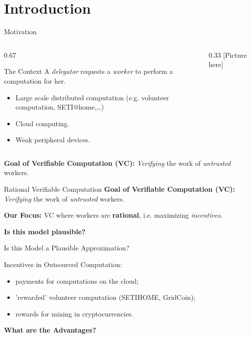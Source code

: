 \section{Introduction}

\begin{frame}{Motivation}

\begin{columns}
	\begin{column}{0.67\textwidth}
\begin{block}{The Context}
	A \textit{delegator} requests a \textit{worker} to perform a computation for her.
\end{block}
\onslide<+->
\begin{itemize}[<+- | alert@+>]
	\item Large scale distributed computation (e.g. volunteer computation, SETI@home,\dots)
	\item Cloud computing.
	\item Weak peripheral devices.
\end{itemize}
\end{column}
\begin{column}{0.33\textwidth}
[Picture here]
\end{column}
\end{columns}
\pause
\bigskip
\textbf{Goal of Verifiable Computation (VC):} \textit{Verifying} the work of \textit{untrusted} workers.
\end{frame}

\begin{frame}{Rational Verifiable Computation}
\textbf{Goal of Verifiable Computation (VC):} \textit{Verifying} the work of \textit{untrusted} workers.\pause

\textbf{Our Focus: } VC where workers are \textbf{rational}, \pause i.e. maximizing \textit{incentives}. \pause

\bigskip
\textbf{Is this model plausible?}


\end{frame}

\begin{frame}{Is this Model a Plausible Approximation?}
\begin{block}{Incentives in Outsourced Computation:}
	\begin{itemize}[<+- | alert@+>]
		\item  payments for computations on the cloud; %
		\item 'rewarded' volunteer computation (SETI\@ HOME, GridCoin);
		\item  rewards for mining in cryptocurrencies.
	\end{itemize}
\end{block}\pause 
\textbf{What are the Advantages?}
\end{frame}


